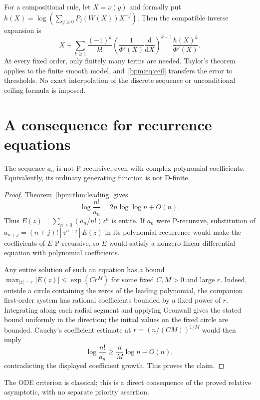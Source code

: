 \documentclass[11pt,a4paper]{article}
\theoremstyle{remark}\newtheorem{remark}[theorem]{Remark}%
\begin{document}
For a compositional rule, let $X=\nu(y)$ and formally put
$h(X)=\log(\sum_{j\ge0}P_j(W(X))X^{-j})$. Then the compatible inverse expansion is
\begin{equation}\label{bpm:eq:inverserule}
 X+\sum_{k\ge1}\frac{(-1)^k}{k!}
 \left(\frac1{\Phi'(X)}\frac{\mathrm d}{\mathrm dX}\right)^{k-1}
 \frac{h(X)^k}{\Phi'(X)}.
\end{equation}
At every fixed order, only finitely many terms are needed. Taylor's theorem applies to the finite smooth model, and~\eqref{bpm:eq:ceil} transfers the error to thresholds. No exact interpolation of the discrete sequence or unconditional ceiling formula is imposed.

\section{A consequence for recurrence equations}
\begin{proposition}\label{bpm:prop:nonP}
The sequence $a_n$ is not P-recursive, even with complex polynomial
coefficients. Equivalently, its ordinary generating function
is not D-finite.
\end{proposition}
\begin{proof}
Theorem~\ref{bpm:thm:leading} gives
\[
 \log\frac{n!}{a_n}=2n\log\log n+O(n).
\]
Thus $E(z)=\sum_{n\ge0}(a_n/n!)z^n$ is entire. If $a_n$ were
P-recursive, substitution of $a_{n+j}=(n+j)![z^{n+j}]E(z)$ in its
polynomial recurrence would make the coefficients of $E$ P-recursive,
so $E$ would satisfy a nonzero linear differential equation with polynomial
coefficients.

Any entire solution of such an equation has a bound
$\max_{|z|=r}|E(z)|\le\exp(Cr^M)$ for some fixed $C,M>0$ and large $r$.
Indeed, outside a circle containing the zeros of the leading polynomial,
the companion first-order system has rational coefficients bounded by a
fixed power of $r$. Integrating along each radial segment and applying
Gronwall gives the stated bound uniformly in the direction; the initial
values on the fixed circle are bounded.
Cauchy's coefficient estimate at $r=(n/(CM))^{1/M}$ would then imply
\[
 \log\frac{n!}{a_n}\ge\frac nM\log n-O(n),
\]
contradicting the displayed coefficient growth. This proves the claim.
\end{proof}
The ODE criterion is classical; this is a direct consequence of the proved
relative asymptotic, with no separate priority assertion.
\end{document}
